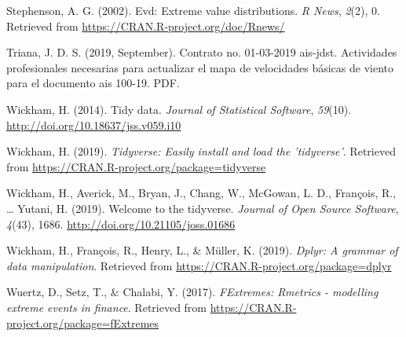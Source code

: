 \documentclass[12pt,oneside]{reedthesis}
\begin{document}
\leavevmode\hypertarget{ref-Stephenson2002}{}%
Stephenson, A. G. (2002). Evd: Extreme value distributions. \emph{R News}, \emph{2}(2), 0. Retrieved from \url{https://CRAN.R-project.org/doc/Rnews/}

\leavevmode\hypertarget{ref-triana2019}{}%
Triana, J. D. S. (2019, September). Contrato no. 01-03-2019 ais-jdst. Actividades profesionales necesarias para actualizar el mapa de velocidades básicas de viento para el documento ais 100-19. PDF.

\leavevmode\hypertarget{ref-Wickham2014}{}%
Wickham, H. (2014). Tidy data. \emph{Journal of Statistical Software}, \emph{59}(10). \url{http://doi.org/10.18637/jss.v059.i10}

\leavevmode\hypertarget{ref-Wickham2019a}{}%
Wickham, H. (2019). \emph{Tidyverse: Easily install and load the 'tidyverse'}. Retrieved from \url{https://CRAN.R-project.org/package=tidyverse}

\leavevmode\hypertarget{ref-Wickham2019b}{}%
Wickham, H., Averick, M., Bryan, J., Chang, W., McGowan, L. D., François, R., \ldots{} Yutani, H. (2019). Welcome to the tidyverse. \emph{Journal of Open Source Software}, \emph{4}(43), 1686. \url{http://doi.org/10.21105/joss.01686}

\leavevmode\hypertarget{ref-Wickham2019}{}%
Wickham, H., François, R., Henry, L., \& Müller, K. (2019). \emph{Dplyr: A grammar of data manipulation}. Retrieved from \url{https://CRAN.R-project.org/package=dplyr}

\leavevmode\hypertarget{ref-Wuertz2017}{}%
Wuertz, D., Setz, T., \& Chalabi, Y. (2017). \emph{FExtremes: Rmetrics - modelling extreme events in finance}. Retrieved from \url{https://CRAN.R-project.org/package=fExtremes}


\end{document}
